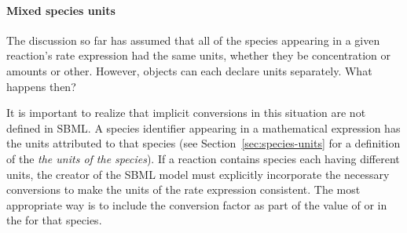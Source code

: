 \paragraph{Mixed species units}

The discussion so far has assumed that all of the species
appearing in a given reaction's rate expression had the same
units, whether they be concentration or amounts or other.
However, \Species objects can each declare units separately.  What
happens then?

It is important to realize that implicit conversions in this
situation are not defined in SBML.  A species identifier appearing
in a mathematical expression has the units attributed to that
species (see Section~\ref{sec:species-units} for a definition of
the \emph{the units of the species}).  If a reaction contains
species each having different units, the creator of the SBML model
must explicitly incorporate the necessary conversions to make the
units of the rate expression consistent.  The most appropriate way
is to include the conversion factor as part of the value of
 or  in the
\SpeciesReference for that species.

